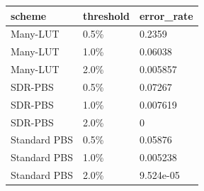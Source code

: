 \small
\setlength{\tabcolsep}{4pt}
\begin{tabular}{lll}
\toprule
scheme & threshold & error\_rate \\
\midrule
Many-LUT & 0.5\% & 0.2359 \\
Many-LUT & 1.0\% & 0.06038 \\
Many-LUT & 2.0\% & 0.005857 \\
SDR-PBS & 0.5\% & 0.07267 \\
SDR-PBS & 1.0\% & 0.007619 \\
SDR-PBS & 2.0\% & 0 \\
Standard PBS & 0.5\% & 0.05876 \\
Standard PBS & 1.0\% & 0.005238 \\
Standard PBS & 2.0\% & 9.524e-05 \\
\bottomrule
\end{tabular}
